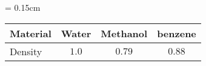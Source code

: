\documentclass[multi=tabular]{standalone}
\begin{document}
\renewcommand{\arraystretch}{1.5}
{\tabcolsep = 0.15cm
  \begin{tabular}{lccc}
   \hline\hline
     Material & Water & Methanol & benzene \\
   \hline 
     Density  & $1.0$ & $0.79$ & $0.88$ \\ 
    \hline
   \hline
  \end{tabular}
}
\renewcommand{\arraystretch}{1.0}
\end{document}
